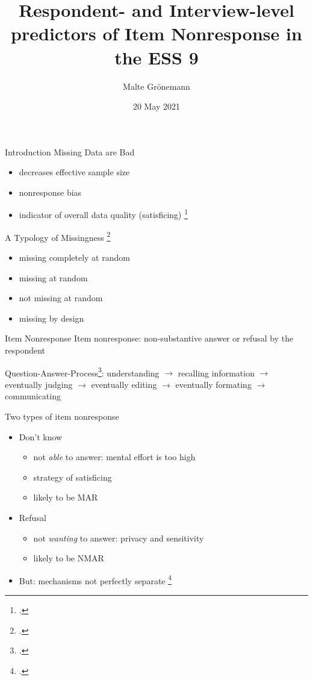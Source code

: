 \documentclass[aspectratio=169]{beamer}
\author{Malte Grönemann}
\title{Respondent- and Interview-level predictors of Item Nonresponse in the ESS 9}
\date{20 May 2021}
\begin{document}
\begin{frame}
\maketitle
\end{frame}


\begin{frame}{Introduction}
 Missing Data are Bad
 \begin{itemize}
  \item decreases effective sample size
  \item nonresponse bias
  \item indicator of overall data quality (satisficing) \footcite{krosnickResponseStrategiesCoping1991}
 \end{itemize}
 
 \bigskip
 
 A Typology of Missingness \footcite{deleeuwPreventionTreatmentItem2003}
 \begin{itemize}
  \item missing completely at random
  \item missing at random
  \item not missing at random
  \item missing by design
 \end{itemize}
\end{frame}


\begin{frame}{Item Nonresponse}
Item nonresponse: non-substantive answer or refusal by the respondent

\bigskip

 Question-Answer-Process\footcite{deleeuwPreventionTreatmentItem2003}: understanding $\rightarrow$ recalling information $\rightarrow$  eventually judging $\rightarrow$  eventually editing $\rightarrow$  eventually formating $\rightarrow$  communicating
 
 \bigskip
 
 Two types of item nonresponse
 \begin{itemize}
  \item Don't know
  \begin{itemize}
  \item not \textit{able} to answer: mental effort is too high
   \item strategy of satisficing
   \item likely to be MAR
  \end{itemize}
\item Refusal
\begin{itemize}
 \item not \textit{wanting} to answer: privacy and sensitivity
 \item likely to be NMAR
\end{itemize}
\item But: mechanisms not perfectly separate \footcite{shoemakerItemNonresponseDistinguishing2002}
\end{itemize}
\end{frame}
\end{document}
